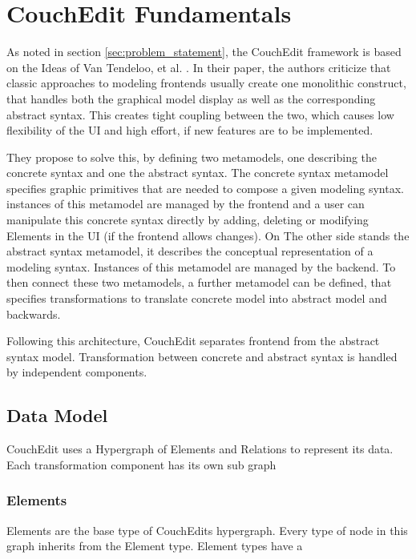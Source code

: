 \chapter{CouchEdit Fundamentals}
As noted in section \ref{sec:problem_statement}, the CouchEdit framework is based on the Ideas of Van Tendeloo, et al. \cite{van_tendeloo_concrete_2017}. In their paper, the authors criticize that classic approaches to modeling frontends usually create one monolithic construct, that handles both the graphical model display as well as the corresponding abstract syntax. This creates tight coupling between the two, which causes low flexibility of the UI and high effort, if new features are to be implemented. 

They propose to solve this, by defining two metamodels, one describing the concrete syntax and one the abstract syntax. The concrete syntax metamodel specifies graphic primitives that are needed to compose a given modeling syntax. instances of this metamodel are managed by the frontend and a user can manipulate this concrete syntax directly by adding, deleting or modifying Elements in the UI (if the frontend allows changes). On The other side stands the abstract syntax metamodel, it describes the conceptual representation of a modeling syntax. Instances of this metamodel are managed by the backend. To then connect these two metamodels, a further metamodel can be defined, that specifies transformations to translate concrete model into abstract model and backwards. 

Following this architecture, CouchEdit separates frontend from the abstract syntax model. Transformation between concrete and abstract syntax is handled by independent components. 


\section{Data Model}
CouchEdit uses a Hypergraph of Elements and Relations to represent its data. Each transformation component has its own sub graph 


\subsection{Elements}
Elements are the base type of CouchEdits hypergraph. Every type of node in this graph inherits from the Element type. Element types have a 



